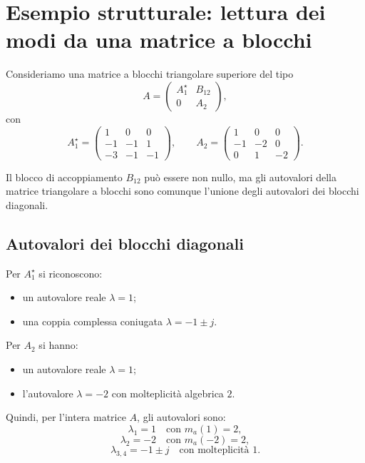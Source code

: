 \section{Esempio strutturale: lettura dei modi da una matrice a blocchi}

Consideriamo una matrice a blocchi triangolare superiore del tipo
\begin{equation}
A=
\begin{pmatrix}
A_1^\star & B_{12}\\
0 & A_2
\end{pmatrix},
\label{eq:L9_Ablock}
\end{equation}
con
\[
A_1^\star=
\begin{pmatrix}
1 & 0 & 0\\
-1 & -1 & 1\\
-3 & -1 & -1
\end{pmatrix},
\qquad
A_2=
\begin{pmatrix}
1 & 0 & 0\\
-1 & -2 & 0\\
0 & 1 & -2
\end{pmatrix}.
\]

Il blocco di accoppiamento $B_{12}$ può essere non nullo, ma gli autovalori della matrice triangolare a blocchi sono comunque l'unione degli autovalori dei blocchi diagonali.

\subsection{Autovalori dei blocchi diagonali}

Per $A_1^\star$ si riconoscono:
\begin{itemize}
    \item un autovalore reale $\lambda=1$;
    \item una coppia complessa coniugata $\lambda=-1\pm j$.
\end{itemize}

Per $A_2$ si hanno:
\begin{itemize}
    \item un autovalore reale $\lambda=1$;
    \item l'autovalore $\lambda=-2$ con molteplicità algebrica $2$.
\end{itemize}

Quindi, per l'intera matrice $A$, gli autovalori sono:
\[
\lambda_1 = 1 \quad \text{con } m_a(1)=2,
\]
\[
\lambda_2 = -2 \quad \text{con } m_a(-2)=2,
\]
\[
\lambda_{3,4} = -1\pm j \quad \text{con molteplicità }1.
\]

